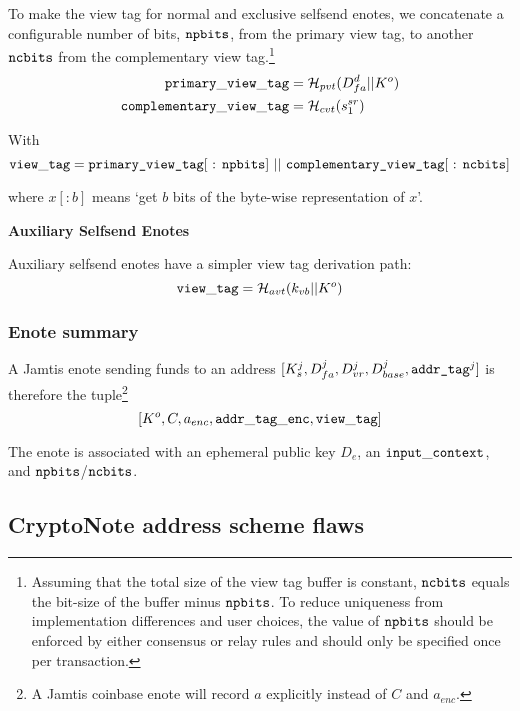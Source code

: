 To make the view tag for normal and exclusive selfsend enotes, we concatenate a configurable number of bits, ${\tt npbits}$, from the primary view tag, to another ${\tt ncbits}$ from the complementary view tag.\footnote{Assuming that the total size of the view tag buffer is constant, ${\tt ncbits}$ equals the bit-size of the buffer minus ${\tt npbits}$. To reduce uniqueness from implementation differences and user choices, the value of ${\tt npbits}$ should be enforced by either consensus or relay rules and should only be specified once per transaction.}
\begin{align*}
    {\tt primary\_view\_tag} &= \mathcal{H}_{pvt}(D^d_{fa} || K^o) \\
    {\tt complementary\_view\_tag} &= \mathcal{H}_{cvt}(s^{sr}_1)
\end{align*}

With
\[ {\tt view\_tag} = \textrm{{\tt primary\_view\_tag}[ : {\tt npbits}] } || \textrm{ {\tt complementary\_view\_tag}[ : {\tt ncbits}]} \]

where $x[:{b}]$ means `get $b$ bits of the byte-wise representation of $x$'.

\textbf{Auxiliary Selfsend Enotes}

Auxiliary selfsend enotes have a simpler view tag derivation path:\vspace{.115cm}
\[ {\tt view\_tag} = \mathcal{H}_{avt}(k_{vb} || K^o) \]

\subsubsection{Enote summary}
\label{subsubsec:jamtis-enote-construction-view-tag}

A Jamtis enote sending funds to an address $[K^j_s, D^j_{fa}, D^j_{vr}, D^j_{base}, \textrm{\tt addr\_tag}^j]$ is therefore the tuple\footnote{A Jamtis coinbase enote will record $a$ explicitly instead of $C$ and $a_{enc}$.}\vspace{.115cm}
\[ [K^o, C, a_{enc}, {\tt addr\_tag\_enc}, {\tt view\_tag}] \]

The enote is associated with an ephemeral public key $D_e$, an ${\tt input\_context}$, and ${\tt npbits}$/${\tt ncbits}$.


\subsection{CryptoNote address scheme flaws}
\label{subsec:jamtis-cryptonote-address-scheme-flaws}

